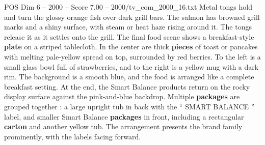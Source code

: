 \begin{textsample}{POS Dim 6 – 2000 – Score 7.00 – 2000/tv\_com\_2000\_16.txt}
Metal tongs hold and turn the glossy orange fish over dark grill bars.
The salmon has browned grill marks and a shiny surface, with steam or heat haze rising around it.
The tongs release it as it settles onto the grill.
The final food scene shows a breakfast-style \textbf{plate} on a striped tablecloth.
In the center are thick \textbf{pieces} of toast or pancakes with melting pale-yellow spread on top, surrounded by red berries.
To the left is a small glass bowl full of strawberries, and to the right is a yellow mug with a dark rim.
The background is a smooth blue, and the food is arranged like a complete breakfast setting.
At the end, the Smart Balance products return on the rocky display surface against the pink-and-blue backdrop.
Multiple \textbf{packages} are grouped together : a large upright tub in back with the “ SMART BALANCE ” label, and smaller Smart Balance \textbf{packages} in front, including a rectangular \textbf{carton} and another yellow tub.
The arrangement presents the brand family prominently, with the labels facing forward.

\end{textsample}
